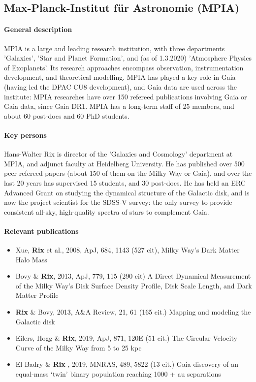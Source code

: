 \subsection{Max-Planck-Institut f\"ur Astronomie (MPIA)}
\label{sec:mpg}

\paragraph{General description}
MPIA is a large and leading research institution, with three departments 'Galaxies', 'Star and Planet Formation', and (as of 1.3.2020) 'Atmosphere Physics of Exoplanets'. Its research approaches encompass observation, instrumentation development, and theoretical modelling. MPIA has played a key role in Gaia (having led the DPAC CU8 development), and Gaia data are used across the institute: MPIA researches have over 150 refereed publications involving Gaia or Gaia data, since Gaia DR1. MPIA has a long-term staff of 25 members, and about 60 post-docs and 60 PhD students.

\paragraph{Key persons} 
Hans-Walter Rix is director of the 'Galaxies and Cosmology' department at MPIA,
and adjunct faculty at Heidelberg University. He has published over 500 peer-refereed papers (about 150 of them on the Milky Way or Gaia),
and over the last 20 years has supervised 15 students, and 30 post-docs.
He has held an ERC Advanced Grant on studying the dynamical structure of the Galactic disk, and is now the project scientist for the SDSS-V survey: the only survey to provide consistent all-sky, high-quality spectra of stars to complement Gaia. 

\paragraph{Relevant publications}
\begin{itemize}
    \item Xue, \textbf{Rix} et al., 2008, ApJ, 684, 1143 (527 cit), Milky Way's Dark Matter Halo Mass
    \item Bovy \& \textbf{Rix}, 2013, ApJ, 779, 115 (290 cit) A Direct Dynamical Measurement of the Milky Way's Disk Surface Density Profile, Disk Scale Length, and Dark Matter Profile 
    \item \textbf{Rix} \& Bovy, 2013, A\&A Review, 21, 61 (165 cit.) Mapping and modeling the Galactic disk
    \item Eilers, Hogg \& \textbf{Rix}, 2019, ApJ, 871, 120E (51 cit.) The Circular Velocity Curve of the Milky Way from 5 to 25 kpc
    \item El-Badry \& \textbf{Rix} , 2019, MNRAS, 489, 5822 (13 cit.) Gaia discovery of an equal-mass `twin' binary population reaching 1000 + au separations
\end{itemize}

